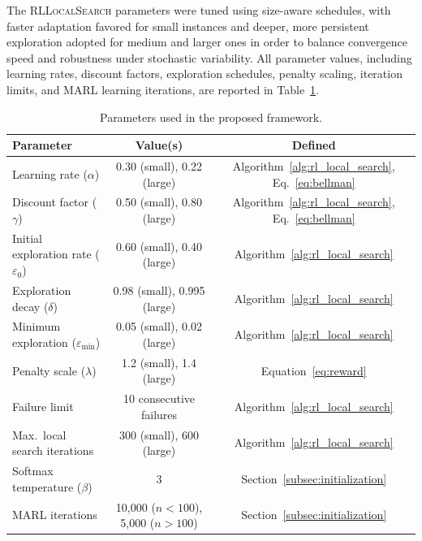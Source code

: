 \documentclass[runningheads]{llncs}
\begin{document}
The \textsc{RLLocalSearch} parameters were tuned using size-aware schedules, with faster adaptation favored for small instances and deeper, more persistent exploration adopted for medium and larger ones in order to balance convergence speed and robustness under stochastic variability. All parameter values, including learning rates, discount factors, exploration schedules, penalty scaling, iteration limits, and MARL learning iterations, are reported in Table~\ref{tab:rl_parameters}.

{
\scriptsize
\setlength{\tabcolsep}{5pt}
\renewcommand{\arraystretch}{1.0}
\begin{table}[ht]
\centering
\caption{Parameters used in the proposed framework.}
\label{tab:rl_parameters}
\begin{tabular}{l c c}
\toprule
\textbf{Parameter} & \textbf{Value(s)} & \textbf{Defined} \\
\midrule
Learning rate ($\alpha$) 
& 0.30 (small), 0.22 (large) 
& Algorithm~\ref{alg:rl_local_search}, Eq.~\ref{eq:bellman} \\

Discount factor ($\gamma$) 
& 0.50 (small), 0.80 (large) 
& Algorithm~\ref{alg:rl_local_search}, Eq.~\ref{eq:bellman}  \\

Initial exploration rate ($\varepsilon_0$) 
& 0.60 (small), 0.40 (large) 
& Algorithm~\ref{alg:rl_local_search} \\

Exploration decay ($\delta$) 
& 0.98 (small), 0.995 (large) 
& Algorithm~\ref{alg:rl_local_search}  \\

Minimum exploration ($\varepsilon_{\min}$) 
& 0.05 (small), 0.02 (large) 
& Algorithm~\ref{alg:rl_local_search}  \\

Penalty scale ($\lambda$) 
& 1.2 (small), 1.4 (large) 
& Equation~\ref{eq:reward} \\

Failure limit 
& 10 consecutive failures 
& Algorithm~\ref{alg:rl_local_search}  \\

Max.\ local search iterations 
& 300 (small), 600 (large) 
& Algorithm~\ref{alg:rl_local_search}  \\

Softmax temperature ($\beta$) 
& 3 
& Section~\ref{subsec:initialization} \\

MARL iterations 
& 10{,}000 ($n<100$), 5{,}000 ($n>100$) 
& Section~\ref{subsec:initialization} \\
\bottomrule
\end{tabular}
\end{table}
}
\end{document}
